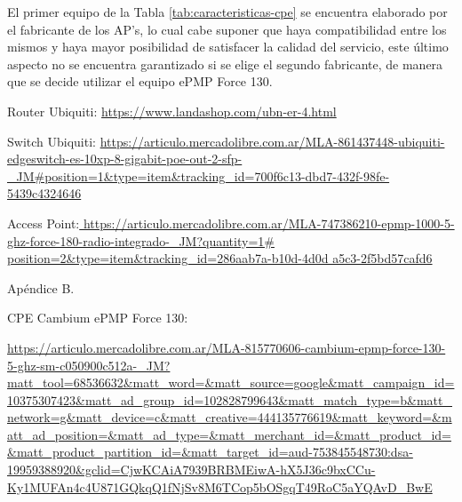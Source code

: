 El primer equipo de la Tabla \ref{tab:caracteristicas-cpe} se encuentra elaborado por el fabricante de los AP's, lo cual cabe suponer que haya compatibilidad entre los mismos y haya mayor posibilidad de satisfacer la calidad del servicio, este último aspecto no se encuentra garantizado si se elige el segundo fabricante, de manera que se decide utilizar el equipo ePMP Force 130.





\newpage






\begin{thebibliography}{99}

 Router Ubiquiti: {\tiny \url{https://www.landashop.com/ubn-er-4.html}}


 Switch Ubiquiti: {\tiny \url{https://articulo.mercadolibre.com.ar/MLA-861437448-ubiquiti-edgeswitch-es-10xp-8-gigabit-poe-out-2-sfp-_JM#position=1&type=item&tracking_id=700f6c13-dbd7-432f-98fe-5439c4324646}}



Access Point:{\tiny \url{ https://articulo.mercadolibre.com.ar/MLA-747386210-epmp-1000-5-ghz-force-180-radio-integrado-_JM?quantity=1# position=2&type=item&tracking_id=286aab7a-b10d-4d0d a5c3-2f5bd57cafd6}}


 Apéndice B.

CPE Cambium ePMP Force 130: \begin{tiny}
\url{https://articulo.mercadolibre.com.ar/MLA-815770606-cambium-epmp-force-130-5-ghz-sm-c050900c512a-_JM?matt_tool=68536632&matt_word=&matt_source=google&matt_campaign_id=10375307423&matt_ad_group_id=102828799643&matt_match_type=b&matt_network=g&matt_device=c&matt_creative=444135776619&matt_keyword=&matt_ad_position=&matt_ad_type=&matt_merchant_id=&matt_product_id=&matt_product_partition_id=&matt_target_id=aud-753845548730:dsa-19959388920&gclid=CjwKCAiA7939BRBMEiwA-hX5J36c9bxCCu-Ky1MUFAn4c4U871GQkqQ1fNjSv8M6TCop5bOSgqT49RoC5aYQAvD_BwE}
\end{tiny}
\end{thebibliography}

\newpage